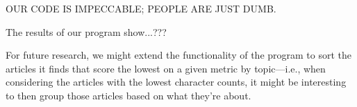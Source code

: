 \documentclass[fontsize=12pt]{article}
\begin{document}
\begin{multicols}{2}
    OUR CODE IS IMPECCABLE; PEOPLE ARE JUST DUMB.
    
    The results of our program show...???
    
    For future research, we might extend the functionality of the program to sort the articles it finds that score the lowest on a given metric by topic---i.e., when considering the articles with the lowest character counts, it might be interesting to then group those articles based on what they're about. %
    

\end{multicols}

\linespread{2}
\newpage
\end{document}
